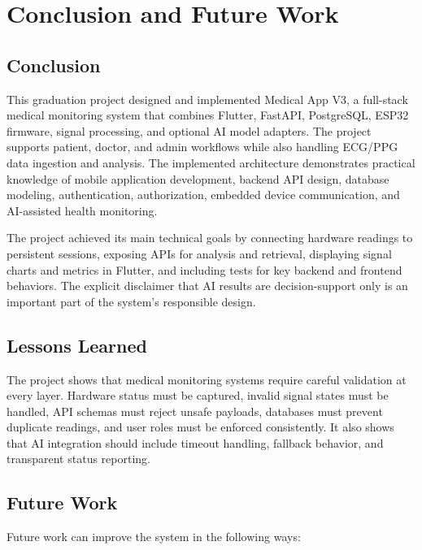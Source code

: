 \chapter{Conclusion and Future Work}

\section{Conclusion}

This graduation project designed and implemented Medical App V3, a full-stack medical monitoring system that combines Flutter, FastAPI, PostgreSQL, ESP32 firmware, signal processing, and optional AI model adapters. The project supports patient, doctor, and admin workflows while also handling ECG/PPG data ingestion and analysis. The implemented architecture demonstrates practical knowledge of mobile application development, backend API design, database modeling, authentication, authorization, embedded device communication, and AI-assisted health monitoring.

The project achieved its main technical goals by connecting hardware readings to persistent sessions, exposing APIs for analysis and retrieval, displaying signal charts and metrics in Flutter, and including tests for key backend and frontend behaviors. The explicit disclaimer that AI results are decision-support only is an important part of the system's responsible design.

\section{Lessons Learned}

The project shows that medical monitoring systems require careful validation at every layer. Hardware status must be captured, invalid signal states must be handled, API schemas must reject unsafe payloads, databases must prevent duplicate readings, and user roles must be enforced consistently. It also shows that AI integration should include timeout handling, fallback behavior, and transparent status reporting.

\section{Future Work}

Future work can improve the system in the following ways:


